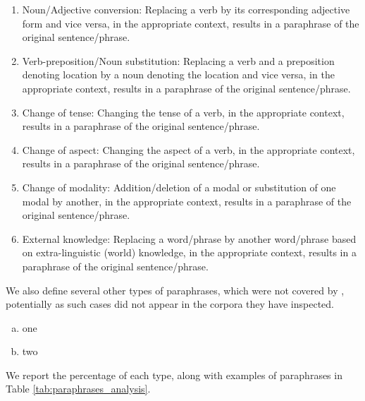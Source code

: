 \begin{enumerate}
    \item Noun/Adjective conversion: Replacing a verb by its corresponding adjective form and vice versa, in the appropriate context, results in a paraphrase of the original sentence/phrase.
    \item Verb-preposition/Noun substitution: Replacing a verb and a preposition denoting location by a noun denoting the location and vice versa, in the appropriate context, results in a paraphrase of the original sentence/phrase.
    \item Change of tense: Changing the tense of a verb, in the appropriate context, results in a paraphrase of the original sentence/phrase.
    \item Change of aspect: Changing the aspect of a verb, in the appropriate context, results in a paraphrase of the original sentence/phrase.
    \item Change of modality: Addition/deletion of a modal or substitution of one modal by another, in the appropriate context, results in a paraphrase of the original sentence/phrase.
    \item External knowledge: Replacing a word/phrase by another word/phrase based on extra-linguistic (world) knowledge, in the appropriate context, results in a paraphrase of the original sentence/phrase.
\end{enumerate}

We also define several other types of paraphrases, which were not covered by \citet{what_is_paraphrase}, potentially as such cases did not appear in the corpora they have inspected.

\begin{enumerate}[a.]
\item one
\item two
\end{enumerate}


We report the percentage of each type, along with examples of paraphrases in Table \ref{tab:paraphrases_analysis}.

